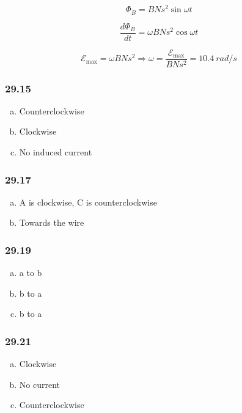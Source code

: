 \documentclass{article}
\begin{document}
\[\Phi_B = B N s^2 \sin \omega t\]

\[\frac{d \Phi_B}{dt} = \omega B N s^2 \cos \omega t\]

\[\mathcal{E}_\text{max} = \omega B N s^2 \Rightarrow \omega = \frac{\mathcal{E}_\text{max}}{B N s^2} = \qty{10.4}{rad/s}\]

\subsubsection{29.15}

\begin{enumerate}[(a)]
  \item Counterclockwise

  \item Clockwise

  \item No induced current
\end{enumerate}

\subsubsection{29.17}

\begin{enumerate}[(a)]
  \item A is clockwise, C is counterclockwise

  \item Towards the wire
\end{enumerate}

\subsubsection{29.19}

\begin{enumerate}[(a)]
  \item a to b

  \item b to a

  \item b to a
\end{enumerate}

\subsubsection{29.21}

\begin{enumerate}[(a)]
  \item Clockwise

  \item No current

  \item Counterclockwise
\end{enumerate}
\end{document}
